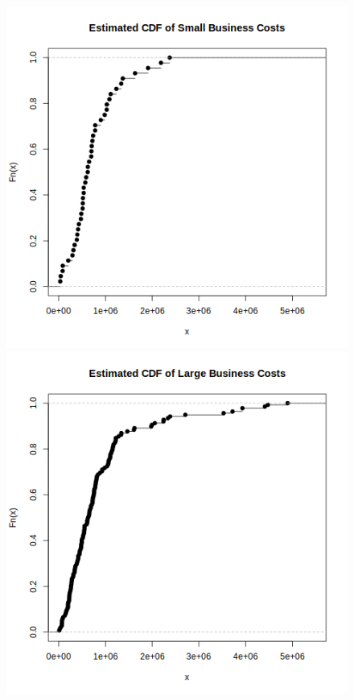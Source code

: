 \begin{figure}[ht!]
\end{figure}

\begin{figure}[ht!]
\includegraphics[scale=0.5]{imgs/F_s.png}
\includegraphics[scale=0.5]{imgs/F_l.png}
\end{figure}

